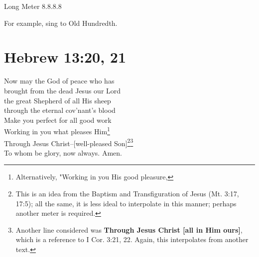 \documentclass{article}
\begin{document}
\noindent Long Meter 8.8.8.8

\noindent For example, sing to Old Hundredth.

\section*{Hebrew 13:20, 21}

 Now may the God of peace who has\\
brought from the dead Jesus our Lord\\
the great Shepherd of all His sheep\\
through the eternal cov'nant's blood\\

 Make you perfect for all good work\\
Working in you what pleases Him\footnote{Alternatively, "Working in you His good pleasure,}\\
Through Jesus Christ--[well-pleased Son]\footnote{This is an idea from the Baptism and Transfiguration of Jesus (Mt. 3:17, 17:5); all the same, it is less ideal to interpolate in this manner; perhaps another meter is required.}\footnote{Another line considered was \textbf{Through Jesus Christ [all in Him ours]}, which is a reference to I Cor. 3:21, 22. Again, this interpolates from another text.}\\
To whom be glory, now always. Amen.
\end{document}
